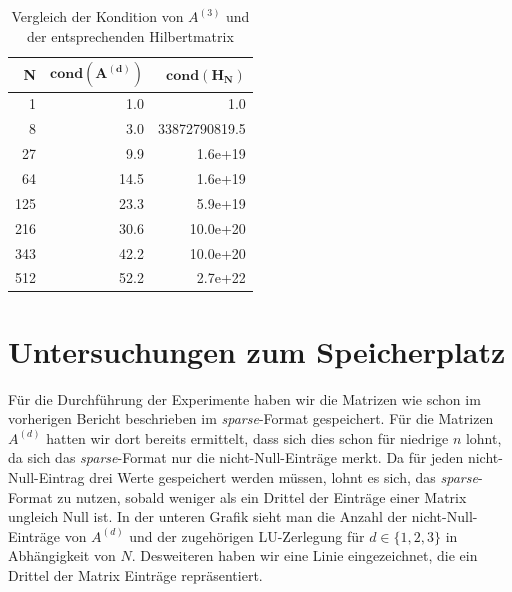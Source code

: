 \documentclass{scrartcl}
\begin{document}
\begin{table}[ht!]
\centering
\begin{tabular}{|r|r|r|}
\hline
\textbf{N} & $\mathbf{cond(A^{(d)})}$ & $\mathbf{cond(H_N)}$       \\ \hline
1          & 1.0                       & 1.0                    \\ \hline
8          & 3.0                       & 33872790819.5      \\ \hline
27         & 9.9                       & 1.6e+19 \\ \hline
64         & 14.5                      & 1.6e+19 \\ \hline
125        & 23.3                      & 5.9e+19  \\ \hline
216        & 30.6                      & 10.0e+20   \\ \hline
343        & 42.2                      & 10.0e+20  \\ \hline
512        & 52.2                      & 2.7e+22   \\ \hline
\end{tabular}
\caption{Vergleich der Kondition von $A^{(3)}$ und der entsprechenden Hilbertmatrix}
\end{table}

\pagebreak
\section{Untersuchungen zum Speicherplatz}
Für die Durchführung der Experimente haben wir die Matrizen wie schon im vorherigen Bericht beschrieben im \textit{sparse}-Format gespeichert.
Für die Matrizen $A^{(d)}$ hatten wir dort bereits ermittelt, dass sich dies schon für niedrige $n$ lohnt, da sich das \textit{sparse}-Format nur die nicht-Null-Einträge merkt.
Da für jeden nicht-Null-Eintrag drei Werte gespeichert werden müssen, lohnt es sich, das \textit{sparse}-Format zu nutzen, sobald weniger als ein Drittel der Einträge einer Matrix ungleich Null ist.
In der unteren Grafik sieht man die Anzahl der nicht-Null-Einträge von $A^{(d)}$ und der zugehörigen LU-Zerlegung für $d\in\{1, 2, 3\}$ in Abhängigkeit von $N$.
Desweiteren haben wir eine Linie eingezeichnet, die ein Drittel der Matrix Einträge repräsentiert.
\end{document}
